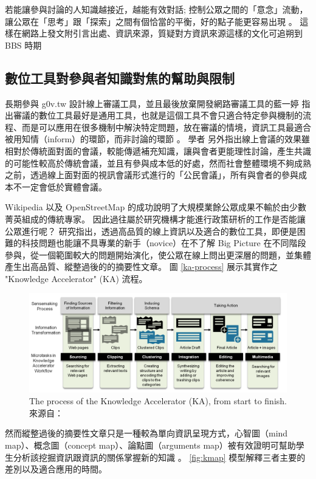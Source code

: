 \documentclass[12pt,a4paper]{article}
\begin{document}
若能讓參與討論的人知識越接近，越能有效對話; 控制公眾之間的「意念」流動，讓公眾在「思考」跟「探索」之間有個恰當的平衡，好的點子能更容易出現 \citep*{pentland14_shu}。 這樣在網路上發文附引言出處、資訊來源，質疑對方資訊來源這樣的文化可追朔到 BBS 時期 \citep*{malaita15}

\subsection{數位工具對參與者知識對焦的幫助與限制}
\label{sec:org3662958}
長期參與 g0v.tw 設計線上審議工具，並且最後放棄開發網路審議工具的藍一婷
指出審議的數位工具最好是通用工具，也就是這個工具不會只適合特定參與機制的流程、而是可以應用在很多機制中解決特定問題，放在審議的情境，資訊工具最適合被用知情（inform）的環節，而非討論的環節 \citep{etblue18,etblue2017}。 學者 \citep*{chen08} 另外指出線上會議的效果雖相對於傳統面對面的會議，較能傳遞補充知識，讓與會者更能理性討論，產生共識的可能性較高於傳統會議，並且有參與成本低的好處，然而社會整體環境不夠成熟之前，透過線上面對面的視訊會議形式進行的「公民會議」，所有與會者的參與成本不一定會低於實體會議。

Wikipedia 以及 OpenStreetMap 的成功說明了大規模業餘公眾成果不輸於由少數菁英組成的傳統專家。
因此過往屬於研究機構才能進行政策研析的工作是否能讓公眾進行呢？ \citep*{hahn16} 研究指出，透過高品質的線上資訊以及適合的數位工具，即便是困難的科技問題也能讓不具專業的新手（novice）在不了解 Big Picture 在不同階段參與，從一個範圍較大的問題開始演化，使公眾在線上問出更深層的問題，並集體產生出高品質、縱整過後的的摘要性文章。 圖 \ref{ka-process} 展示其實作之 "Knowledge Accelerator" (KA) 流程。

\begin{figure}[htbp]
\centering
\includegraphics[width=.9\linewidth]{./images/ka-process.png}
\caption{\label{fig:orgd3bdbc0}
The process of the Knowledge Accelerator (KA), from start to finish. 來源自： \citep{hahn16}}
\end{figure}

然而縱整過後的摘要性文章只是一種較為單向資訊呈現方式，心智圖（mind map）、概念圖（concept map）、論點圖（arguments map）被有效證明可幫助學生分析該挖掘資訊跟資訊的關係掌握新的知識 \citep*{davies10} 。 \ref{fig:kmap} 模型解釋三者主要的差別以及適合應用的時間。
\end{document}

